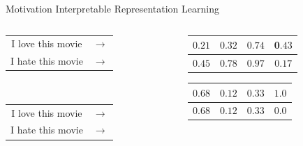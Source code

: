 \documentclass{beamer}
\begin{document}
\begin{frame}{Motivation}
	\centering
	{\Large Interpretable Representation Learning} \\
	\vspace{1cm}
	\begin{columns}[T] %
		\begin{column}{.3\textwidth}
			\centering
			\begin{tabular}{ c c }
				I love this movie & $\rightarrow$ \\
				I hate this movie & $\rightarrow$ \\
			\end{tabular} \\
			\vspace{1.8cm}
			{\color{white} \begin{tabular}{ c c }
					I love this movie & $\rightarrow$ \\
					I hate this movie & $\rightarrow$ \\
				\end{tabular}}
		\end{column}
		\hfill
		\begin{column}{.6\textwidth}
			\centering
			\begin{tabular}{ | c | c | c | c | }
				\hline
				$0.21$ & $0.32$ & $0.74$ & 0$.43$ \\
				\hline
				$0.45$ & $0.78$ & $0.97$ & 0$.17$ \\
				\hline
			\end{tabular}
			{\color{white}{\Huge$$\Downarrow$$}
			\begin{tabular}{ | c | c | c | c | }
				\hline
				$0.68$ & $0.12$ & $0.33$ & $1.0$ \\
				\hline
				\hline
				$0.68$ & $0.12$ & $0.33$ & $0.0$ \\
				\hline
			\end{tabular}}
		\end{column}
	\end{columns}
\end{frame}
\end{document}
